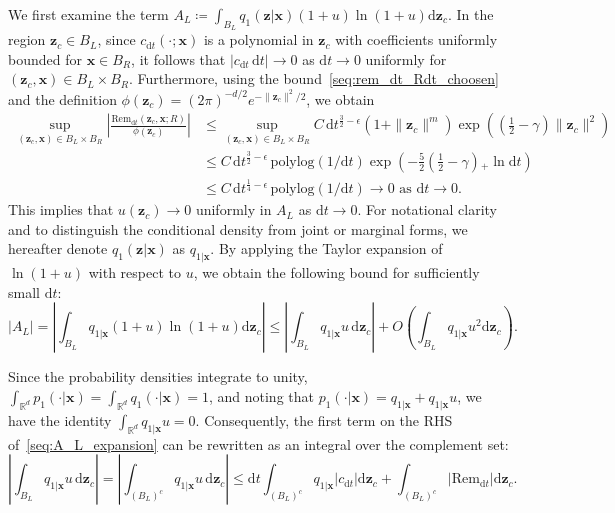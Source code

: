 \documentclass[
 longbibliography,
 twocolumn,
 superscriptaddress,
 amsmath,
 amssymb,
 amsthm,
 amsfonts,
 prl,
 floatfix,
]{revtex4-2}
\begin{document}
\begin{widetext}
We first examine the term $A_L\coloneq\int_{B_L}q_1(\bm z|\bm x)(1+u)\ln(1+u)\mathrm d\bm z_c$. In the region $\bm z_c\in B_L$, since $c_{\mathrm dt}(\cdot;\bm x)$ is a polynomial in $\bm z_c$ 
with coefficients uniformly bounded for $\bm x\in B_R$, it follows that $|c_{\mathrm dt}\,\mathrm dt|\rightarrow0$ as $\mathrm dt\rightarrow0$ uniformly for $(\bm z_c,\bm x)\in B_L\times B_R$. Furthermore, using the bound~\eqref{seq:rem_dt_Rdt_choosen} and the definition $\phi(\bm z_c)=(2\pi)^{-d/2}e^{-\|\bm z_c\|^2/2}$, we obtain
\begin{equation}
\begin{aligned}
    \sup_{(\bm z_c,\bm x)\in B_L\times B_R}
    \left|\frac{\mathrm{Rem}_{\mathrm dt}(\bm z_c,\bm x;R)}{\phi(\bm z_c)}\right|
    &\leq
    \sup_{(\bm z_c,\bm x)\in B_L\times B_R}
    C\,\mathrm dt^{\frac{3}{2}-\epsilon}(1+\|\bm z_c\|^m)
    \exp\!\left(\!\left(\frac{1}{2}-\gamma\right)\|\bm z_c\|^2\right)
    \\
    &\leq
    C\,\mathrm dt^{\frac{3}{2}-\epsilon}\,
    \text{polylog}(1/\mathrm dt)
    \exp\!\left(-\frac{5}{2}\left(\frac{1}{2}-\gamma\right)\!\!_+ \ln\mathrm dt\right)
    \\
    &\leq C\,\mathrm dt^{\frac{1}{4}-\epsilon}\,
    \text{polylog}(1/\mathrm dt)
    \rightarrow0
    \text{ as }\mathrm dt\rightarrow 0.
\end{aligned}
\label{seq:rem_over_q_bound_compact_RL}
\end{equation}
This implies that $u(\bm z_c)\rightarrow0$ uniformly in $A_L$ as $\mathrm dt\rightarrow0$. For notational clarity and to distinguish the conditional density from joint or marginal forms, we hereafter denote $q_1(\bm z|\bm x)$ as $q_{1|\bm x}$. By applying the Taylor expansion of $\ln(1+u)$ with respect to $u$, we obtain the following bound for sufficiently small $\mathrm dt$:
\begin{equation}
    |A_L|
    =
    \left|\int_{B_L}q_{1|\bm x}(1+u)\ln(1+u)\mathrm d\bm z_c\right|
    \leq
    \left|\int_{B_L}q_{1|\bm x}u\,\mathrm d\bm z_c\right|
    +O\!\left(
    \int_{B_L}q_{1|\bm x}u^2\mathrm d\bm z_c\right)
    \label{seq:A_L_expansion}.
\end{equation}

Since the probability densities integrate to unity, $\int_{\mathbb R^d} p_1(\cdot|\bm x)=\int_{\mathbb R^d} q_1(\cdot|\bm x)=1$, and noting that $p_1(\cdot|\bm x)=q_{1|\bm x}+q_{1|\bm x}u$, we have the identity $\int_{\mathbb R^d} q_{1|\bm x}u=0$. Consequently, the first term on the RHS of~\eqref{seq:A_L_expansion} can be rewritten as an integral over the complement set:
\begin{equation}
    \left|\int_{B_L}q_{1|\bm x}u\,\mathrm d\bm z_c\right|
    =\left|\int_{(B_L)^c}q_{1|\bm x}u\,\mathrm d\bm z_c\right|
    \leq\mathrm dt\int_{(B_L)^c}q_{1|\bm x}|c_{\mathrm dt}|\mathrm d\bm z_c
    +\int_{(B_L)^c}|\mathrm{Rem}_{\mathrm dt}|\mathrm d\bm z_c.
    \label{seq:q1_u_integral_bound}
\end{equation}


\end{widetext}
\end{document}
